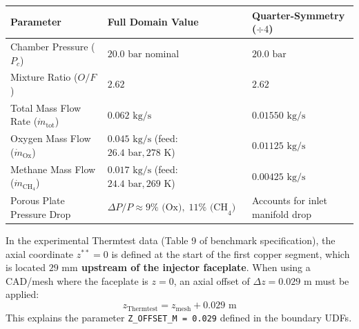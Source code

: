 \documentclass[11pt,a4paper]{article}
\begin{document}
\begin{table}[htbp]
\centering
\small
\begin{tabularx}{\textwidth}{L{4.5cm} Y L{4.5cm}}
\toprule
\textbf{Parameter} & \textbf{Full Domain Value} & \textbf{Quarter-Symmetry ($\div 4$)} \\
\midrule
Chamber Pressure ($P_c$) & $20.0\text{ bar}$ nominal & $20.0\text{ bar}$ \\
Mixture Ratio ($O/F$) & $2.62$ & $2.62$ \\
Total Mass Flow Rate ($\dot{m}_\text{tot}$) & $0.062\text{ kg/s}$ & $0.01550\text{ kg/s}$ \\
Oxygen Mass Flow ($\dot{m}_\text{Ox}$) & $0.045\text{ kg/s}$ (feed: $26.4\text{ bar}, 278\text{ K}$) & $0.01125\text{ kg/s}$ \\
Methane Mass Flow ($\dot{m}_{\text{CH}_4}$) & $0.017\text{ kg/s}$ (feed: $24.4\text{ bar}, 269\text{ K}$) & $0.00425\text{ kg/s}$ \\
Porous Plate Pressure Drop & $\Delta P / P \approx 9\%\text{ (Ox)}, \; 11\%\text{ (CH}_4\text{)}$ & Accounts for inlet manifold drop \\
\bottomrule
\end{tabularx}
\end{table}

\begin{tcolorbox}[basebox, title={Critical Coordinate Origin Note (\texttt{Z\_OFFSET\_M})}]
In the experimental Thermtest data (Table 9 of benchmark specification), the axial coordinate $z^{**} = 0$ is defined at the start of the first copper segment, which is located \textbf{$29\text{ mm}$ upstream of the injector faceplate}. When using a CAD/mesh where the faceplate is $z=0$, an axial offset of $\Delta z = 0.029\text{ m}$ must be applied:
\[
z_\text{Thermtest} = z_\text{mesh} + 0.029\text{ m}
\]
This explains the parameter \texttt{Z\_OFFSET\_M = 0.029} defined in the boundary UDFs.
\end{tcolorbox}

\end{document}
